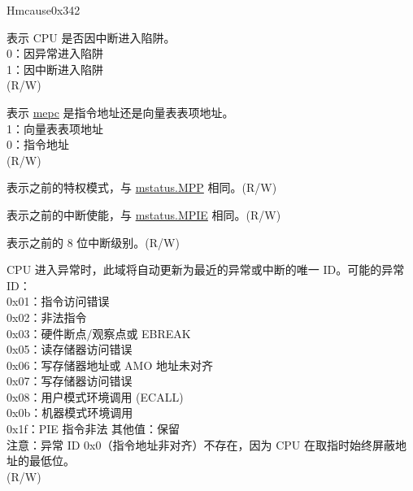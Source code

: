 \begin{register}{H}{mcause}{0x342}\label{regdesc:MCAUSE}
%
%
%
%
%
%
%
%
\regnewline%
\begin{regdesc}\begin{reglist}
\label{fielddesc:MCAUSEINT}\item [INT] 表示 CPU 是否因中断进入陷阱。\\
0：因异常进入陷阱\\
1：因中断进入陷阱\\
(R/W)
\label{fielddesc:MCAUSE_MINHV}\item [MINHV] 表示 \hyperref[fielddesc:MEPC]{mepc} 是指令地址还是向量表表项地址。\\
1：向量表表项地址\\
0：指令地址\\
(R/W)
\label{fielddesc:MCAUSE_MPP}\item [MPP] 表示之前的特权模式，与 \hyperref[fielddesc:MSTATUSMPP]{mstatus.MPP} 相同。(R/W)
\label{fielddesc:MCAUSE_MPIE}\item [MPIE] 表示之前的中断使能，与 \hyperref[fielddesc:MSTATUSMPIE]{mstatus.MPIE} 相同。(R/W)
\label{fielddesc:MCAUSE_MPIL}\item [MPIL] 表示之前的 8 位中断级别。(R/W)
\label{fielddesc:MCAUSECODE}\item [CODE] CPU 进入异常时，此域将自动更新为最近的异常或中断的唯一 ID。可能的异常 ID：\\
0x01：指令访问错误\\
0x02：非法指令\\
0x03：硬件断点/观察点或 EBREAK\\
0x05：读存储器访问错误\\
0x06：写存储器地址或 AMO 地址未对齐\\
0x07：写存储器访问错误\\
0x08：用户模式环境调用 (ECALL)\\
0x0b：机器模式环境调用\\
0x1f：PIE 指令非法
其他值：保留\\
注意：异常 ID 0x0（指令地址非对齐）不存在，因为 CPU 在取指时始终屏蔽地址的最低位。\\
(R/W)
\end{reglist}\end{regdesc}
\end{register}


